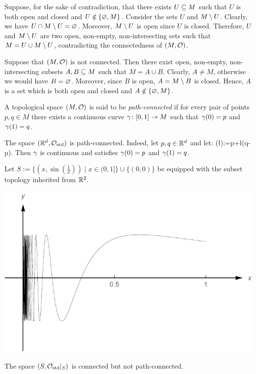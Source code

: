 \bq
\ben
\item[($\imp$)] Suppose, for the sake of contradiction, that there exists $U\subseteq M$ such that $U$ is both open and closed and $U\notin\{\varnothing,M\}$. Consider the sets $U$ and $M\setminus U$. Clearly, we have $U \cap M\setminus U = \varnothing$. Moreover, $M\setminus U$ is open since $U$ is closed. Therefore, $U$ and $M\setminus U$ are two open, non-empty, non-intersecting sets such that $M = U \cup M \setminus U$, contradicting the connectedness of $(M,\mathcal{O})$.
\item[($\Leftarrow$)] Suppose that $(M,\mathcal{O})$ is not connected. Then there exist open, non-empty, non-intersecting subsets $A,B\subseteq M$ such that $M=A\cup B$. Clearly, $A \neq M$, otherwise we would have $B=\varnothing$. Moreover, since $B$ is open, $A=M\setminus B$ is closed. Hence, $A$ is a set which is both open and closed and $A \notin \{\varnothing,M\}$.\qedhere
\een
\eq

\bd
A topological space $(M,\mathcal{O})$ is said to be \emph{path-connected} if for every pair of points $p,q\in M$ there exists a continuous curve $\gamma\colon[0,1]\to M$ such that $\gamma(0)=p$ and $\gamma(1)=q$.
\ed

\be
The space $(\mathbb{R}^d,\mathcal{O}_\mathrm{std})$ is path-connected. Indeed, let $p,q\in\mathbb{R}^d$ and let:
\bse
\g(\l):=p+\l(q-p).
\ese
Then $\gamma$ is continuous and satisfies $\gamma(0)=p$ and $\gamma(1)=q$.
\ee

\be
Let $S:=\{(x,\sin(\tfrac{1}{x}))\mid x\in (0,1]\}\cup \{(0,0)\}$ be equipped with the subset topology inherited from $\mathbb{R}^2$.
\begin{center}
\includegraphics[scale=0.7]{graphics/sinoneoverx}
\end{center}
The space $(S,\mathcal{O}_\mathrm{std}|_S)$ is connected but not path-connected.
\ee

